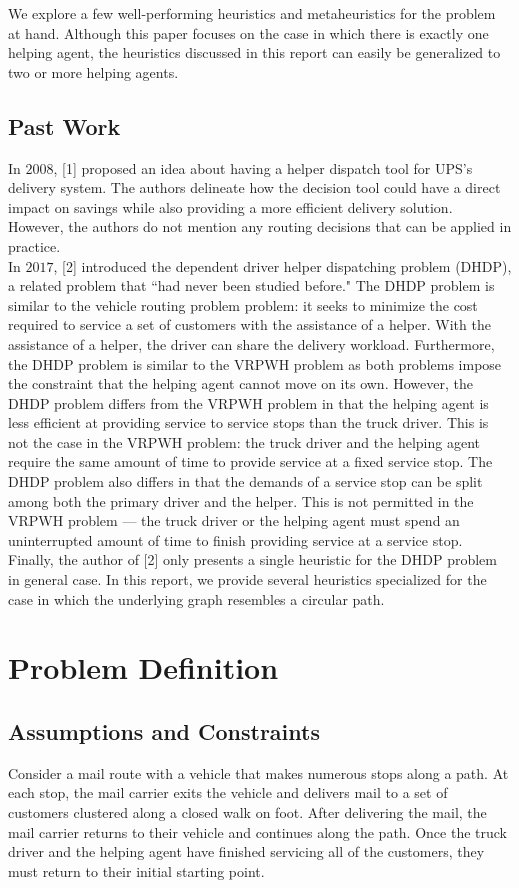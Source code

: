 \documentclass[12pt]{scrartcl}
\begin{document}
We explore a few well-performing heuristics and metaheuristics for the problem at hand. Although this paper focuses on the case in which there is exactly one helping agent, the heuristics discussed in this report can easily be generalized to two or more helping agents.

\subsection{Past Work}
In $2008$, [1] proposed an idea about having a helper dispatch tool for UPS's delivery system. The authors delineate how the decision tool could have a direct impact on savings while also providing a more efficient delivery solution. However, the authors do not mention any routing decisions that can be applied in practice.  \\

In $2017$, [2] introduced the dependent driver helper dispatching problem (DHDP), a related problem that ``had never been studied before." The DHDP problem is similar to the vehicle routing problem problem: it seeks to minimize the cost required to service a set of customers with the assistance of a helper. With the assistance of a helper, the driver can share the delivery workload. Furthermore, the DHDP problem is similar to the VRPWH problem as both problems impose the constraint that the helping agent cannot move on its own. However, the DHDP problem differs from the VRPWH problem in that the helping agent is less efficient at providing service to service stops than the truck driver. This is not the case in the VRPWH problem: the truck driver and the helping agent require the same amount of time to provide service at a fixed service stop. The DHDP problem also differs in that the demands of a service stop can be split among both the primary driver and the helper. This is not permitted in the VRPWH problem --- the truck driver or the helping agent must spend an uninterrupted amount of time to finish providing service at a service stop. Finally, the author of [2] only presents a single heuristic for the DHDP problem in general case. In this report, we provide several heuristics specialized for the case in which the underlying graph resembles a circular path.


\section{Problem Definition}
\subsection{Assumptions and Constraints}
Consider a mail route with a vehicle that makes numerous stops along a path. At each stop, the mail carrier exits the vehicle and delivers mail to a set of customers clustered along a closed walk on foot. After delivering the mail, the mail carrier returns to their vehicle and continues along the path. Once the truck driver and the helping agent have finished servicing all of the customers, they must return to their initial starting point. \\ %
\end{document}
